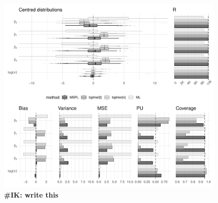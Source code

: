\documentclass[11pt, a4paper]{article}
\newcommand{\IK}[1]{{\noindent \color{blue} \bf \#IK: #1}}
\theoremstyle{example} \newtheorem{example}{Example}[section]
\theoremstyle{theorem} \newtheorem{theorem}{Theorem}[section]
\begin{document}
\begin{figure}[t]
  \begin{center}
    \includegraphics[width = \textwidth]{Figures/simulation_results.pdf}
  \end{center}
  \caption{\IK{write this}}
  \label{fig:culcita_simu0}
\end{figure}
\end{document}
